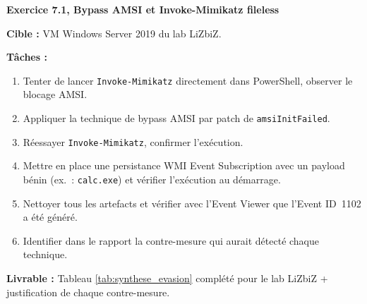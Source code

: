 \begin{boxexo}
\textbf{Exercice 7.1, Bypass AMSI et Invoke-Mimikatz fileless}

\medskip
\textbf{Cible :} VM Windows Server 2019 du lab LiZbiZ.

\medskip
\textbf{Tâches :}
\begin{enumerate}
    \item Tenter de lancer \texttt{Invoke-Mimikatz} directement dans
          PowerShell, observer le blocage AMSI.
    \item Appliquer la technique de bypass AMSI par patch de
          \texttt{amsiInitFailed}.
    \item Réessayer \texttt{Invoke-Mimikatz}, confirmer l'exécution.
    \item Mettre en place une persistance WMI Event Subscription avec
          un payload bénin (ex.~: \texttt{calc.exe}) et vérifier
          l'exécution au démarrage.
    \item Nettoyer tous les artefacts et vérifier avec l'Event Viewer
          que l'Event ID~1102 a été généré.
    \item Identifier dans le rapport la contre-mesure qui aurait détecté
          chaque technique.
\end{enumerate}

\medskip
\textbf{Livrable :} Tableau \ref{tab:synthese_evasion} complété pour
le lab LiZbiZ + justification de chaque contre-mesure.
\end{boxexo}
